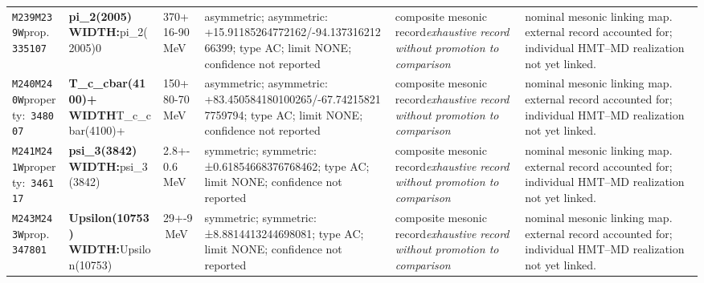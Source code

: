 \begin{landscape}
\begin{longtable}{L{1.85cm}L{4.45cm}L{2.35cm}L{4.05cm}L{3.35cm}L{7.15cm}}
\texttt{M239}\newline \texttt{M239W}\newline prop.\ \texttt{335107} & \textbf{pi\_\allowbreak{}2(2005) WIDTH:}\newline pi\_\allowbreak{}2(2005)0 & 370+16-90\,MeV & asymmetric; asymmetric: +15.91185264772162/-94.13731621266399; type AC; limit NONE; confidence not reported & composite mesonic record\newline \emph{exhaustive record without promotion to comparison} & nominal mesonic linking map. external record accounted for; individual HMT--MD realization not yet linked. \\
\texttt{M240}\newline \texttt{M240W}\newline property:\ \texttt{348007} & \textbf{T\_\allowbreak{}c\_\allowbreak{}cbar(4100)+ WIDTH}\newline T\_\allowbreak{}c\_\allowbreak{}cbar(4100)+ & 150+80-70\,MeV & asymmetric; asymmetric: +83.450584180100265/-67.742158217759794; type AC; limit NONE; confidence not reported & composite mesonic record\newline \emph{exhaustive record without promotion to comparison} & nominal mesonic linking map. external record accounted for; individual HMT--MD realization not yet linked. \\
\texttt{M241}\newline \texttt{M241W}\newline property:\ \texttt{346117} & \textbf{psi\_\allowbreak{}3(3842) WIDTH:}\newline psi\_\allowbreak{}3(3842) & 2.8+-0.6\,MeV & symmetric; symmetric: ±0.61854668376768462; type AC; limit NONE; confidence not reported & composite mesonic record\newline \emph{exhaustive record without promotion to comparison} & nominal mesonic linking map. external record accounted for; individual HMT--MD realization not yet linked. \\
\texttt{M243}\newline \texttt{M243W}\newline prop.\ \texttt{347801} & \textbf{Upsilon(10753) WIDTH:}\newline Upsilon(10753) & 29+-9\,MeV & symmetric; symmetric: ±8.8814413244698081; type AC; limit NONE; confidence not reported & composite mesonic record\newline \emph{exhaustive record without promotion to comparison} & nominal mesonic linking map. external record accounted for; individual HMT--MD realization not yet linked. \\

\end{longtable}
\end{landscape}
